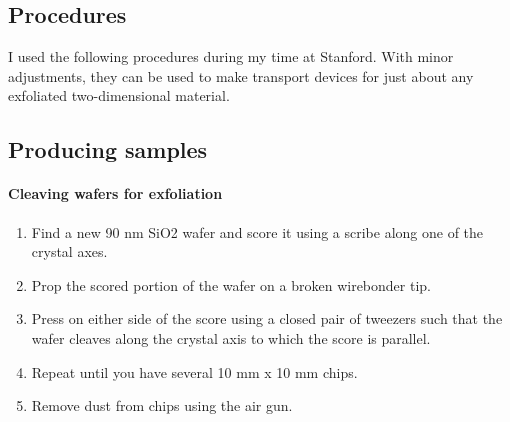 \begin{appendices}

\chapter{Procedures}

I used the following procedures during my time at Stanford. With minor adjustments, they can be used to make transport devices for just about any exfoliated two-dimensional material.

\section{Producing samples}

\subsubsection{Cleaving wafers for exfoliation}
\begin{enumerate}
	\item Find a new 90 nm SiO2 wafer and score it using a scribe along one of the crystal axes.
	\item Prop the scored portion of the wafer on a broken wirebonder tip.
	\item Press on either side of the score using a closed pair of tweezers such that the wafer cleaves along the crystal axis to which the score is parallel.
	\item Repeat until you have several 10 mm x 10 mm chips.
	\item Remove dust from chips using the air gun.
\end{enumerate}


\end{appendices}
